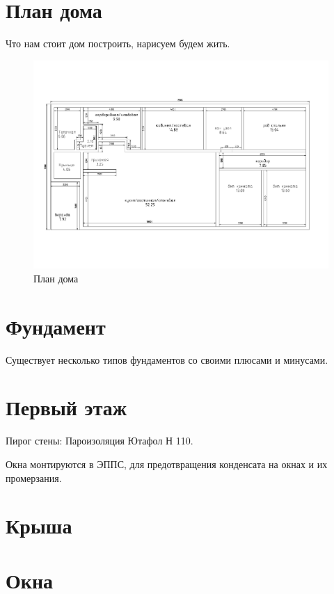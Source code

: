 \documentclass[10pt, twocolumn]{report}
\begin{document}
\chapter{План дома}
Что нам стоит дом построить, нарисуем будем жить.

\begin{figure}[h]
	\centering
	\includegraphics[width=1.0\textwidth]{img/plan.pdf}
	\caption{План дома}
	\label{fig:plan}
\end{figure}

\chapter{Фундамент}

Существует несколько типов фундаментов со своими плюсами и минусами.

\chapter{Первый этаж}

Пирог стены:
Пароизоляция Ютафол Н 110.

Окна монтируются в ЭППС, для предотвращения конденсата на окнах и их промерзания.

\chapter{Крыша}

\chapter{Окна}
\end{document}
